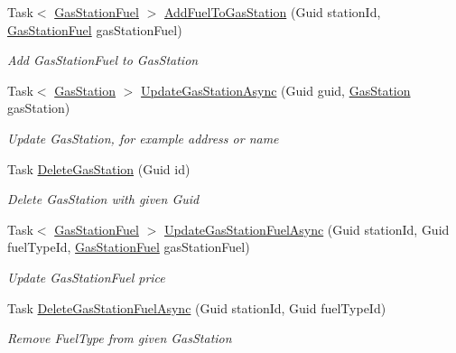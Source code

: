 \begin{DoxyCompactItemize}
Task$<$ \mbox{\hyperlink{class_gasoline_1_1_data_1_1_models_1_1_gas_station_fuel}{Gas\+Station\+Fuel}} $>$ \mbox{\hyperlink{interface_gasoline_1_1_data_1_1_services_1_1_i_gas_station_service_ac98dd15c284e623253f9fcec2cd2db97}{Add\+Fuel\+To\+Gas\+Station}} (Guid station\+Id, \mbox{\hyperlink{class_gasoline_1_1_data_1_1_models_1_1_gas_station_fuel}{Gas\+Station\+Fuel}} gas\+Station\+Fuel)
\begin{DoxyCompactList}\small\item\em Add Gas\+Station\+Fuel to Gas\+Station \end{DoxyCompactList}\item 
Task$<$ \mbox{\hyperlink{class_gasoline_1_1_data_1_1_models_1_1_gas_station}{Gas\+Station}} $>$ \mbox{\hyperlink{interface_gasoline_1_1_data_1_1_services_1_1_i_gas_station_service_ae172cf0f9448fd6c9d24c2ced6b1afdc}{Update\+Gas\+Station\+Async}} (Guid guid, \mbox{\hyperlink{class_gasoline_1_1_data_1_1_models_1_1_gas_station}{Gas\+Station}} gas\+Station)
\begin{DoxyCompactList}\small\item\em Update Gas\+Station, for example address or name \end{DoxyCompactList}\item 
Task \mbox{\hyperlink{interface_gasoline_1_1_data_1_1_services_1_1_i_gas_station_service_a43d0139d482190c88cbc255af14c7837}{Delete\+Gas\+Station}} (Guid id)
\begin{DoxyCompactList}\small\item\em Delete Gas\+Station with given Guid \end{DoxyCompactList}\item 
Task$<$ \mbox{\hyperlink{class_gasoline_1_1_data_1_1_models_1_1_gas_station_fuel}{Gas\+Station\+Fuel}} $>$ \mbox{\hyperlink{interface_gasoline_1_1_data_1_1_services_1_1_i_gas_station_service_a88e35520ad60feb8c04c609a47c064ff}{Update\+Gas\+Station\+Fuel\+Async}} (Guid station\+Id, Guid fuel\+Type\+Id, \mbox{\hyperlink{class_gasoline_1_1_data_1_1_models_1_1_gas_station_fuel}{Gas\+Station\+Fuel}} gas\+Station\+Fuel)
\begin{DoxyCompactList}\small\item\em Update Gas\+Station\+Fuel price \end{DoxyCompactList}\item 
Task \mbox{\hyperlink{interface_gasoline_1_1_data_1_1_services_1_1_i_gas_station_service_a2d8ab6257dbfd8bf3ade23604bf33ca2}{Delete\+Gas\+Station\+Fuel\+Async}} (Guid station\+Id, Guid fuel\+Type\+Id)
\begin{DoxyCompactList}\small\item\em Remove Fuel\+Type from given Gas\+Station \end{DoxyCompactList}\item 

\end{DoxyCompactItemize}
